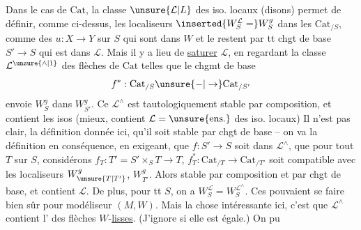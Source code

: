 Dans le cas de $\mathrm{Cat}$, la classe $\unsure{\mathcal L|L}$ des iso. locaux (disons) permet de définir, comme ci-dessus, les localiseurs $\inserted{W_S^{\mathcal L}=}W_S^g$ dans les $\mathrm{Cat}_{/S}$, comme  des $u:X\to Y$ sur $S$ qui sont dans $W$ et le restent par tt chgt de base $S'\to S$ qui est dans $\mathcal L$.
Mais il y a lieu de \uline{saturer} $\mathcal L$, en regardant  la classe $\mathcal L^{\unsure{\wedge|1}}$ des flèches  de $\mathrm{Cat}$ telles que le chgmt de base
\[
f^*:\mathrm{Cat}_{/S}\unsure{-|\to}\mathrm{Cat}_{/S'}
\]
envoie $W_S^g$ dans $W_{S'}^g$. Ce $\mathcal L^{\wedge}$ est tautologiquement stable par composition, et contient les isos (mieux, contient $\mathcal L=\unsure{\text{ens.}}$ des iso. locaux) Il n'est pas clair,  la définition donnée ici, qu'il soit stable par chgt de base -- on va   la définition en conséquence, en exigeant,   que $f:S'\to S$ soit dans $\mathcal L^\wedge$, que pour tout $T$ sur $S$, considérons $f_T:T'=S'\times_S T\to T$,
$f_T^*:\mathrm{Cat}_{/T}\to\mathrm{Cat}_{/T'}$  soit compatible avec les localiseurs $W_{\unsure{T|T'}}^g$, $W_{T'}^g$. Alors   stable  par composition et par chgt de base, et  contient $\mathcal L$. De plus, pour tt $S$, on a $W_S^{\mathcal L}=W_S^{\mathcal L^\wedge}$.
Ces   pouvaient se faire bien sûr pour  modéliseur $(M,W)$. Mais la chose intéressante ici, c'est que $\mathcal L^\wedge$ contient l'  des flèches $W$-\uline{lisses}. (J'ignore si elle est égale.) On   pu
